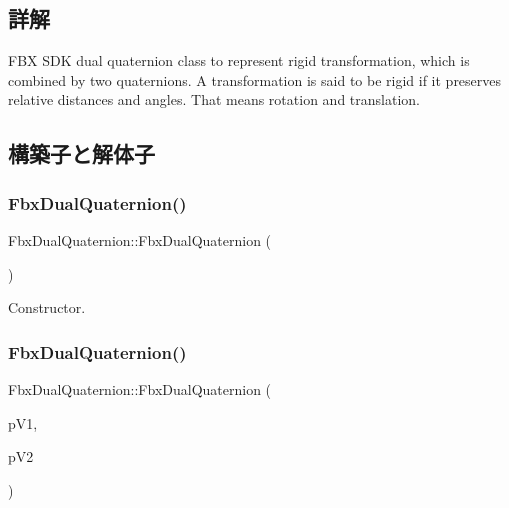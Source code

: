 \subsection{詳解}
F\+BX S\+DK dual quaternion class to represent rigid transformation, which is combined by two quaternions. A transformation is said to be rigid if it preserves relative distances and angles. That means rotation and translation. 

\subsection{構築子と解体子}
\mbox{\label{class_fbx_dual_quaternion_a254ddc7798c408f023ee7ab3f10c4980}} 
\subsubsection{\texorpdfstring{Fbx\+Dual\+Quaternion()}{FbxDualQuaternion()}\hspace{0.1cm}{\footnotesize\ttfamily [1/5]}}
{\footnotesize\ttfamily Fbx\+Dual\+Quaternion\+::\+Fbx\+Dual\+Quaternion (\begin{DoxyParamCaption}{ }\end{DoxyParamCaption})}



Constructor. 

\mbox{\label{class_fbx_dual_quaternion_aa8cb9c92f1ad60ff2146473f24922224}} 
\subsubsection{\texorpdfstring{Fbx\+Dual\+Quaternion()}{FbxDualQuaternion()}\hspace{0.1cm}{\footnotesize\ttfamily [2/5]}}
{\footnotesize\ttfamily Fbx\+Dual\+Quaternion\+::\+Fbx\+Dual\+Quaternion (\begin{DoxyParamCaption}\item[{const \hyperlink{class_fbx_quaternion}{Fbx\+Quaternion} \&}]{p\+V1,  }\item[{const \hyperlink{class_fbx_quaternion}{Fbx\+Quaternion} \&}]{p\+V2 }\end{DoxyParamCaption})}

